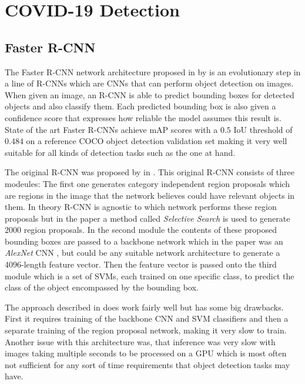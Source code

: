 \chapter{COVID-19 Detection}\label{chapter:detection}


\section{Faster R-CNN}\label{chapter:rcnn}

The Faster R-CNN network architecture proposed in \autocite{ren_faster_2016} by \citeauthor{ren_faster_2016} is an evolutionary step in a line of \acp{R-CNN} which are \acp{CNN} that can perform object detection on images. When given an image, an \ac{R-CNN} is able to predict bounding boxes for detected objects and also classify them. Each predicted bounding box is also given a confidence score that expresses how reliable the model assumes this result is. State of the art Faster \acp{R-CNN} achieve \ac{mAP} scores with a $0.5$ \ac{IoU} threshold of $0.484$ on a reference COCO object detection validation set making it very well suitable for all kinds of detection tasks such as the one at hand. 

The original \ac{R-CNN} was proposed by \citeauthor{girshick_rich_2014} in \autocite{girshick_rich_2014}. This original \ac{R-CNN} consists of three modeules: The first one generates category independent region proposals which are regions in the image that the network believes could have relevant objects in them. In theory \ac{R-CNN} is agnostic to which network performs these region proposals but in the paper a method called \textit{Selective Search} \autocite{uijlings_selective_2013} is used to generate $2000$ region proposals. In the second module the contents of these proposed bounding boxes are passed to a backbone network which in the paper was an \textit{AlexNet} CNN \autocite{krizhevsky_imagenet_2017}, but could be any suitable network architecture to generate a 4096-length feature vector. Then the feature vector is passed onto the third module which is a set of \acp{SVM}, each trained on one specific class, to predict the class of the object encompassed by the bounding box.

The approach described in \autocite{girshick_rich_2014} does work fairly well but has some big drawbacks. First it requires training of the backbone CNN and \ac{SVM} classifiers and then a separate training of the region proposal network, making it very slow to train. Another issue with this architecture was, that inference was very slow with images taking multiple seconds to be processed on a GPU which is most often not sufficient for any sort of time requirements that object detection tasks may have.

